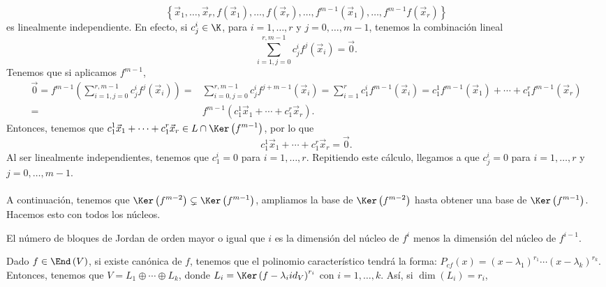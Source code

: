 \[ \left\{ \vec{x}_{1}, \ldots, \vec{x}_{r}, f\left(\vec{x}_{1}\right), \ldots, f\left(\vec{x}_{r}\right), \ldots, f^{m-1}\left(\vec{x}_{1}\right), \ldots, f^{m -1}f\left(\vec{x}_{r}\right)\right\}  \]
es linealmente independiente. En efecto, si $\displaystyle c^{i}_{j} \in \K $, para $\displaystyle i = 1, \ldots, r $ y $\displaystyle j = 0, \ldots, m -1 $, tenemos la combinación lineal
\[\sum^{r, m -1}_{i = 1, j=0}c^{i}_{j}f^{j}\left(\vec{x}_{i}\right) = \vec{0} .\]
Tenemos que si aplicamos $\displaystyle f^{m -1} $,
\[
\begin{split}
	\vec{0} = f^{m -1}\left(\sum^{r, m -1}_{i = 1, j=0}c^{i}_{j}f^{j}\left(\vec{x}_{i}\right)\right) =& \sum^{r, m -1}_{i = 0, j = 0}c^{i}_{j}f^{j+m -1}\left(\vec{x}_{i}\right)=\sum^{r}_{i = 1}c^{i}_{1}f^{m -1}\left(\vec{x}_{i}\right) = c^{1}_{1}f^{m-1}\left(\vec{x}_{1}\right) + \cdots + c^{r}_{1}f^{m -1}\left(\vec{x}_{r}\right) \\
	= & f^{m -1}\left(c^{1}_{1}\vec{x}_{1}+ \cdots + c^{r}_{1}\vec{x}_{r}\right).
\end{split}
\]
Entonces, tenemos que $\displaystyle c^{1}_{1}\vec{x}_{1}+ \cdots + c^{r}_{1}\vec{x}_{r} \in L \cap \Ker\left(f^{m -1}\right) $, por lo que
\[ c^{1}_{1}\vec{x}_{1}+ \cdots + c^{r}_{1}\vec{x}_{r} = \vec{0} .\]
Al ser linealmente independientes, tenemos que $\displaystyle c^{i}_{1} =0 $ para $\displaystyle i = 1, \ldots, r $. Repitiendo este cálculo, llegamos a que $\displaystyle c^{i}_{j} = 0 $ para $\displaystyle i = 1, \ldots, r $ y $\displaystyle j = 0, \ldots, m -1 $. \\ \\
A continuación, tenemos que $\displaystyle \Ker\left(f^{m -2}\right) \subsetneq \Ker\left(f^{m -1}\right) $, ampliamos la base de $\displaystyle \Ker\left(f^{m -2}\right) $ hasta obtener una base de $\displaystyle \Ker\left(f^{m -1}\right) $. Hacemos esto con todos los núcleos. 
\begin{observation}
\normalfont El número de bloques de Jordan de orden mayor o igual que $\displaystyle i $ es la dimensión del núcleo de $\displaystyle f^{i} $ menos la dimensión del núcleo de $\displaystyle f^{i-1} $.
\end{observation}
Dado $\displaystyle f \in \End\left(V\right) $, si existe canónica de $\displaystyle f $, tenemos que el polinomio característico tendrá la forma: $\displaystyle P_{cf}\left(x\right) = \left(x-\lambda_{1}\right)^{r_{1}} \cdots \left(x - \lambda_{k}\right)^{r_{k}} $. Entonces, tenemos que $\displaystyle V = L_{1} \oplus \cdots \oplus L_{k} $, donde $\displaystyle L_{i} = \Ker\left(f-\lambda_{i}id _{V}\right)^{r_{i}} $ con $\displaystyle i =1, \ldots, k $. Así, si $\displaystyle \dim\left(L_{i}\right) = r_{i}$,
